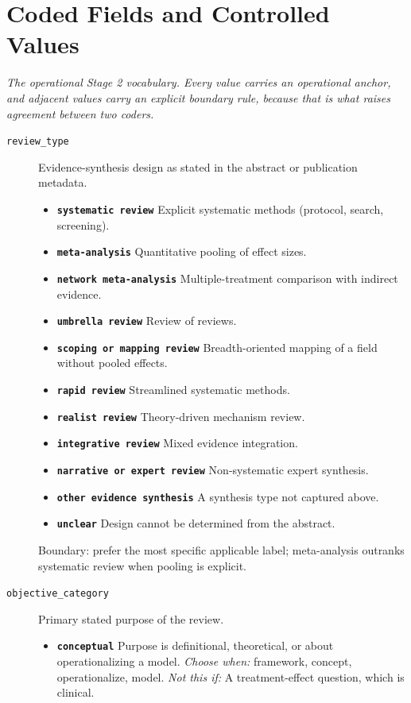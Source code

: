 \documentclass[11pt]{article}
\begin{document}
\section*{Coded Fields and Controlled Values}
{\small\itshape The operational Stage 2 vocabulary. Every value carries an operational anchor, and adjacent values carry an explicit boundary rule, because that is what raises agreement between two coders.}\par\smallskip
\begin{description}
\item[\texttt{review\_type}] Evidence-synthesis design as stated in the abstract or publication metadata.
  \begin{itemize}[leftmargin=1.3em,itemsep=2pt,topsep=2pt]
  \item \textbf{\texttt{systematic review}} Explicit systematic methods (protocol, search, screening).
  \item \textbf{\texttt{meta-analysis}} Quantitative pooling of effect sizes.
  \item \textbf{\texttt{network meta-analysis}} Multiple-treatment comparison with indirect evidence.
  \item \textbf{\texttt{umbrella review}} Review of reviews.
  \item \textbf{\texttt{scoping or mapping review}} Breadth-oriented mapping of a field without pooled effects.
  \item \textbf{\texttt{rapid review}} Streamlined systematic methods.
  \item \textbf{\texttt{realist review}} Theory-driven mechanism review.
  \item \textbf{\texttt{integrative review}} Mixed evidence integration.
  \item \textbf{\texttt{narrative or expert review}} Non-systematic expert synthesis.
  \item \textbf{\texttt{other evidence synthesis}} A synthesis type not captured above.
  \item \textbf{\texttt{unclear}} Design cannot be determined from the abstract.
  \end{itemize}
{\small Boundary: prefer the most specific applicable label; meta-analysis outranks systematic review when pooling is explicit.}
\item[\texttt{objective\_category}] Primary stated purpose of the review.
  \begin{itemize}[leftmargin=1.3em,itemsep=2pt,topsep=2pt]
  \item \textbf{\texttt{conceptual}} Purpose is definitional, theoretical, or about operationalizing a model. {\small \textit{Choose when:} framework, concept, operationalize, model. \textit{Not this if:} A treatment-effect question, which is clinical.}

\end{itemize}
\end{description}
\end{document}
